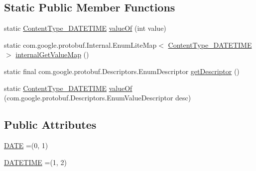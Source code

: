 \subsection*{Static Public Member Functions}
\begin{DoxyCompactItemize}
\item 
static \mbox{\hyperlink{enumcom_1_1mysql_1_1cj_1_1x_1_1protobuf_1_1_mysqlx_resultset_1_1_content_type___d_a_t_e_t_i_m_e}{Content\+Type\+\_\+\+D\+A\+T\+E\+T\+I\+ME}} \mbox{\hyperlink{enumcom_1_1mysql_1_1cj_1_1x_1_1protobuf_1_1_mysqlx_resultset_1_1_content_type___d_a_t_e_t_i_m_e_ac08602ab33879d1d9bb39ffbd575f147}{value\+Of}} (int value)
\item 
static com.\+google.\+protobuf.\+Internal.\+Enum\+Lite\+Map$<$ \mbox{\hyperlink{enumcom_1_1mysql_1_1cj_1_1x_1_1protobuf_1_1_mysqlx_resultset_1_1_content_type___d_a_t_e_t_i_m_e}{Content\+Type\+\_\+\+D\+A\+T\+E\+T\+I\+ME}} $>$ \mbox{\hyperlink{enumcom_1_1mysql_1_1cj_1_1x_1_1protobuf_1_1_mysqlx_resultset_1_1_content_type___d_a_t_e_t_i_m_e_aef83d59e03c578e698bfc93a03611d8a}{internal\+Get\+Value\+Map}} ()
\item 
static final com.\+google.\+protobuf.\+Descriptors.\+Enum\+Descriptor \mbox{\hyperlink{enumcom_1_1mysql_1_1cj_1_1x_1_1protobuf_1_1_mysqlx_resultset_1_1_content_type___d_a_t_e_t_i_m_e_ae7f5888be5a77359eed504dbcb75bbc9}{get\+Descriptor}} ()
\item 
static \mbox{\hyperlink{enumcom_1_1mysql_1_1cj_1_1x_1_1protobuf_1_1_mysqlx_resultset_1_1_content_type___d_a_t_e_t_i_m_e}{Content\+Type\+\_\+\+D\+A\+T\+E\+T\+I\+ME}} \mbox{\hyperlink{enumcom_1_1mysql_1_1cj_1_1x_1_1protobuf_1_1_mysqlx_resultset_1_1_content_type___d_a_t_e_t_i_m_e_ae4c84a62071131f315a3b74691fbebcc}{value\+Of}} (com.\+google.\+protobuf.\+Descriptors.\+Enum\+Value\+Descriptor desc)
\end{DoxyCompactItemize}
\subsection*{Public Attributes}
\begin{DoxyCompactItemize}
\item 
\mbox{\hyperlink{enumcom_1_1mysql_1_1cj_1_1x_1_1protobuf_1_1_mysqlx_resultset_1_1_content_type___d_a_t_e_t_i_m_e_a30212d00ab311043597150438c4c0c6d}{D\+A\+TE}} =(0, 1)
\item 
\mbox{\hyperlink{enumcom_1_1mysql_1_1cj_1_1x_1_1protobuf_1_1_mysqlx_resultset_1_1_content_type___d_a_t_e_t_i_m_e_a2165b4ca844987956db7dafc8e8e24f5}{D\+A\+T\+E\+T\+I\+ME}} =(1, 2)
\end{DoxyCompactItemize}
